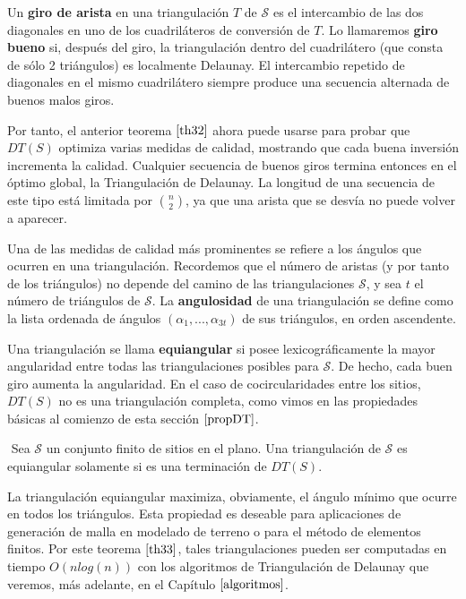 \begin{definicion}
    Un \textbf{giro de arista} en una triangulación $T$ de $\mathcal{S}$ es el intercambio de las dos diagonales en uno de los cuadriláteros de conversión de $T$. Lo llamaremos \textbf{giro bueno} si, después del giro, la triangulación dentro del cuadrilátero (que consta de sólo 2 triángulos) es localmente Delaunay. El intercambio repetido de diagonales en el mismo cuadrilátero siempre produce una secuencia alternada de buenos malos giros.
\end{definicion}
\vspace{0.3cm}

Por tanto, el anterior teorema $\ref{th32}$ ahora puede usarse para probar que $DT(S)$ optimiza varias medidas de calidad, mostrando que cada buena inversión incrementa la calidad. Cualquier secuencia de buenos giros termina entonces en el óptimo global, la Triangulación de Delaunay. La longitud de una secuencia de este tipo está limitada por ${n \choose 2}$, ya que una arista que se desvía no puede volver a aparecer.
\vspace{0.3cm}

Una de las medidas de calidad más prominentes se refiere a los ángulos que ocurren en una triangulación. Recordemos que el número de aristas (y por tanto de los triángulos) no depende del camino de las triangulaciones $\mathcal{S}$, y sea $t$ el número de triángulos de $\mathcal{S}$. La \textbf{angulosidad} de una triangulación se define como la lista ordenada de ángulos $(\alpha_{1},...,\alpha_{3t})$ de sus triángulos, en orden ascendente. 


\begin{definicion}
    Una triangulación se llama \textbf{equiangular} si posee lexicográficamente la mayor angularidad entre todas las triangulaciones posibles para $\mathcal{S}$. De hecho, cada buen giro aumenta la angularidad. En el caso de cocircularidades entre los sitios, $DT(S)$ no es una triangulación completa, como vimos en las propiedades básicas al comienzo de esta sección $\ref{propDT}$.
\end{definicion}

\begin{teorema}$\label{th33}$
    Sea $\mathcal{S}$ un conjunto finito de sitios en el plano. Una triangulación de $\mathcal{S}$ es equiangular solamente si es una terminación de $DT(S)$.
\end{teorema}


La triangulación equiangular maximiza, obviamente, el ángulo mínimo que ocurre en todos los triángulos. Esta propiedad es deseable para aplicaciones de generación de malla en modelado de terreno o para el método de elementos finitos. Por este teorema $\ref{th33}$, tales triangulaciones pueden ser computadas en tiempo $O(nlog(n))$ con los algoritmos de Triangulación de Delaunay que veremos, más adelante, en el Capítulo $\ref{algoritmos}$.
\vspace{0.3cm}


